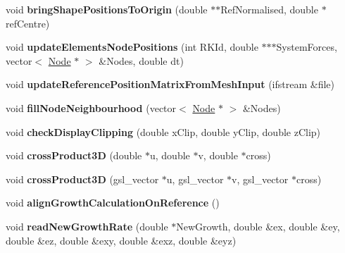 \begin{DoxyCompactItemize}
\item 
\hypertarget{classShapeBase_aa07ce2dcc297aa5aea5a37516dcea069}{}void {\bfseries bring\+Shape\+Positions\+To\+Origin} (double $\ast$$\ast$Ref\+Normalised, double $\ast$ref\+Centre)\label{classShapeBase_aa07ce2dcc297aa5aea5a37516dcea069}

\item 
\hypertarget{classShapeBase_af4df88dad7ec1c487736216e15b5c67a}{}void {\bfseries update\+Elements\+Node\+Positions} (int R\+K\+Id, double $\ast$$\ast$$\ast$System\+Forces, vector$<$ \hyperlink{classNode}{Node} $\ast$ $>$ \&Nodes, double dt)\label{classShapeBase_af4df88dad7ec1c487736216e15b5c67a}

\item 
\hypertarget{classShapeBase_a29d28195e334308f1b3afba113ef1212}{}void {\bfseries update\+Reference\+Position\+Matrix\+From\+Mesh\+Input} (ifstream \&file)\label{classShapeBase_a29d28195e334308f1b3afba113ef1212}

\item 
\hypertarget{classShapeBase_afe299910c51313a27526c585df128047}{}void {\bfseries fill\+Node\+Neighbourhood} (vector$<$ \hyperlink{classNode}{Node} $\ast$ $>$ \&Nodes)\label{classShapeBase_afe299910c51313a27526c585df128047}

\item 
\hypertarget{classShapeBase_a3a3490f8a96e14e59b82f4de24ce48e2}{}void {\bfseries check\+Display\+Clipping} (double x\+Clip, double y\+Clip, double z\+Clip)\label{classShapeBase_a3a3490f8a96e14e59b82f4de24ce48e2}

\item 
\hypertarget{classShapeBase_ab5c4c774227af1d446f80c0ef58044c9}{}void {\bfseries cross\+Product3\+D} (double $\ast$u, double $\ast$v, double $\ast$cross)\label{classShapeBase_ab5c4c774227af1d446f80c0ef58044c9}

\item 
\hypertarget{classShapeBase_a334a6cec6a698ac49006d8216a93ced9}{}void {\bfseries cross\+Product3\+D} (gsl\+\_\+vector $\ast$u, gsl\+\_\+vector $\ast$v, gsl\+\_\+vector $\ast$cross)\label{classShapeBase_a334a6cec6a698ac49006d8216a93ced9}

\item 
\hypertarget{classShapeBase_a9a980e69b3ccad29e21499921d575829}{}void {\bfseries align\+Growth\+Calculation\+On\+Reference} ()\label{classShapeBase_a9a980e69b3ccad29e21499921d575829}

\item 
\hypertarget{classShapeBase_a8f1565bbfd6c6a1452d95d910b4f7d9e}{}void {\bfseries read\+New\+Growth\+Rate} (double $\ast$New\+Growth, double \&ex, double \&ey, double \&ez, double \&exy, double \&exz, double \&eyz)\label{classShapeBase_a8f1565bbfd6c6a1452d95d910b4f7d9e}


\end{DoxyCompactItemize}

